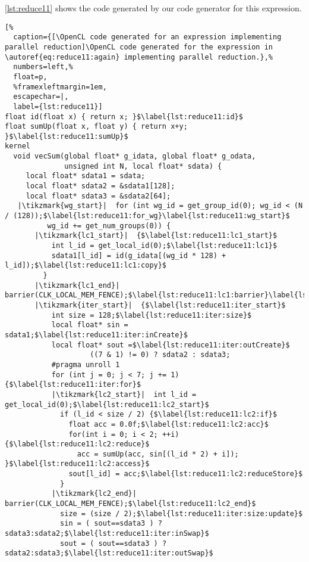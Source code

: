 \vspace{1em}
\noindent
\autoref{lst:reduce11} shows the \OpenCL code generated by our code generator for this expression.
%
\begin{lstlisting}[%
  caption={[\OpenCL code generated for an expression implementing parallel reduction]\OpenCL code generated for the expression in \autoref{eq:reduce11:again} implementing parallel reduction.},%
  numbers=left,%
  float=p,
  %framexleftmargin=1em,
  escapechar=|,
  label={lst:reduce11}]
float id(float x) { return x; }$\label{lst:reduce11:id}$
float sumUp(float x, float y) { return x+y; }$\label{lst:reduce11:sumUp}$
kernel
  void vecSum(global float* g_idata, global float* g_odata,
              unsigned int N, local float* sdata) {
     local float* sdata1 = sdata;
     local float* sdata2 = &sdata1[128];
     local float* sdata3 = &sdata2[64];
   |\tikzmark{wg_start}|  for (int wg_id = get_group_id(0); wg_id < (N / (128));$\label{lst:reduce11:for_wg}\label{lst:reduce11:wg_start}$
          wg_id += get_num_groups(0)) {
       |\tikzmark{lc1_start}|  {$\label{lst:reduce11:lc1_start}$
           int l_id = get_local_id(0);$\label{lst:reduce11:lc1}$
           sdata1[l_id] = id(g_idata[(wg_id * 128) + l_id]);$\label{lst:reduce11:lc1:copy}$
         }
       |\tikzmark{lc1_end}|  barrier(CLK_LOCAL_MEM_FENCE);$\label{lst:reduce11:lc1:barrier}\label{lst:reduce11:lc1_end}$
       |\tikzmark{iter_start}|  {$\label{lst:reduce11:iter_start}$
           int size = 128;$\label{lst:reduce11:iter:size}$
           local float* sin = sdata1;$\label{lst:reduce11:iter:inCreate}$
           local float* sout =$\label{lst:reduce11:iter:outCreate}$
                    ((7 & 1) != 0) ? sdata2 : sdata3;
           #pragma unroll 1
           for (int j = 0; j < 7; j += 1) {$\label{lst:reduce11:iter:for}$
           |\tikzmark{lc2_start}|  int l_id = get_local_id(0);$\label{lst:reduce11:lc2_start}$
             if (l_id < size / 2) {$\label{lst:reduce11:lc2:if}$
               float acc = 0.0f;$\label{lst:reduce11:lc2:acc}$
               for(int i = 0; i < 2; ++i) {$\label{lst:reduce11:lc2:reduce}$
                 acc = sumUp(acc, sin[(l_id * 2) + i]); }$\label{lst:reduce11:lc2:access}$
               sout[l_id] = acc;$\label{lst:reduce11:lc2:reduceStore}$
             }
           |\tikzmark{lc2_end}|  barrier(CLK_LOCAL_MEM_FENCE);$\label{lst:reduce11:lc2_end}$
             size = (size / 2);$\label{lst:reduce11:iter:size:update}$
             sin = ( sout==sdata3 ) ? sdata3:sdata2;$\label{lst:reduce11:iter:inSwap}$
             sout = ( sout==sdata3 ) ? sdata2:sdata3;$\label{lst:reduce11:iter:outSwap}$

\end{lstlisting}
